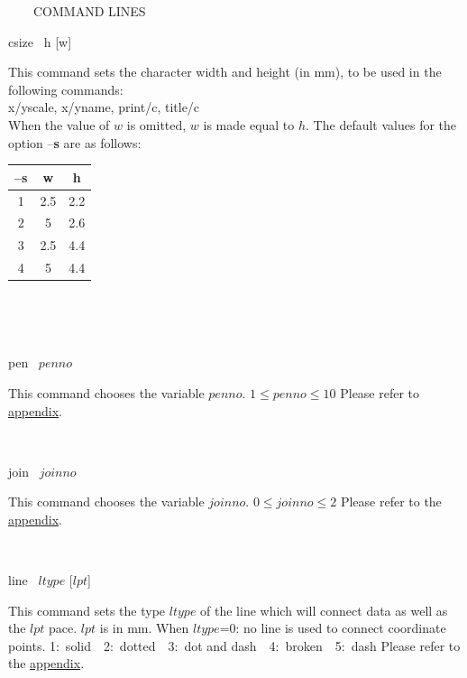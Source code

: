 \begin{qsection}{\ ~~~COMMAND LINES}
\begin{minipage}[t]{5.5cm}
csize ~h [w]
\end{minipage}
\begin{minipage}[t]{9cm}
This command sets the character width and height (in mm),
to be used in the following commands:\\
x/yscale, x/yname, print/c, title/c\\
When the value of $w$ is omitted, $w$ is made equal to $h$.
The default values for the option --{\bf s} are as follows:
\begin{tabular}{ccc}

--{\bf s} &w &h  \\ \hline
1 &2.5 &2.2\\
2&5&2.6\\
3&2.5&4.4\\
4&5&4.4
\end{tabular}\\

\end{minipage}\\

\begin{minipage}[t]{5.5cm}
 pen ~$penno$
\end{minipage}
\begin{minipage}[t]{9cm}
This command chooses the variable $penno$.
$1 \leq  penno \leq 10$
Please refer to \hyperlink{pen-color}{appendix}.
\end{minipage}\\

\begin{minipage}[t]{5.5cm}
 join ~$joinno$
\end{minipage}
\begin{minipage}[t]{9cm}
This command chooses the variable $joinno$.
$0 \leq joinno \leq 2$
Please refer to the \hyperlink{join-type}{appendix}.
\end{minipage}\\

\begin{minipage}[t]{5.5cm}
line ~$ltype$ [$lpt$]
\end{minipage}
\begin{minipage}[t]{9cm}
This command sets the type $ltype$ of the line which will connect
data as well as the $lpt$ pace. $lpt$ is in mm.
When $ltype$=0: no line is used to connect coordinate points.
1:~solid~~2:~dotted~~3:~dot and dash~~4:~broken~~5:~dash
Please refer to the \hyperlink{pen-line}{appendix}.\\
        

\end{minipage}
\end{qsection}
